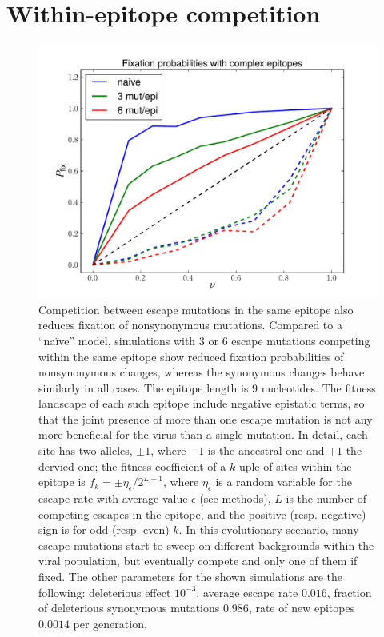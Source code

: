 \documentclass[rmp]{revtex4}
\begin{document}
\newpage
\section{Within-epitope competition}
\begin{figure}[h]
\begin{center}
\includegraphics[width=0.6\linewidth]{simulations_gradually_epitopes}
\caption{
Competition between escape mutations in the same epitope also reduces fixation of
nonsynonymous mutations. Compared to a ``na\"ive'' model,
simulations with 3 or 6 escape mutations competing within the same epitope show
reduced fixation probabilities of nonsynonymous changes, whereas the synonymous
changes behave similarly in all cases. The epitope length is 9 nucleotides. The
fitness landscape of each such epitope include negative epistatic terms, so that
the joint presence of more than one escape mutation is not any more beneficial
for the virus than a single mutation. In detail, each site has two alleles, $\pm
1$, where $-1$ is the ancestral one and $+1$ the dervied one; the fitness
coefficient of a $k$-uple of sites within the epitope is $f_k = \pm
\eta_\epsilon / 2^{L-1}$, where $\eta_\epsilon$ is a random variable for the
escape rate with average value $\epsilon$ (see methods), $L$ is the number of
competing escapes in the epitope, and the positive (resp. negative) sign is for
odd (resp. even) $k$. In this evolutionary scenario, many escape mutations start
to sweep on different backgrounds within the viral population, but eventually
compete and only one of them if fixed. The other parameters for the shown simulations are
the following: deleterious effect $10^{-3}$, average escape rate $0.016$,
fraction of deleterious synonymous mutations $0.986$, rate of new epitopes
$0.0014$ per generation.
}
\label{fig:wec}
\end{center}
\end{figure}


\end{document}
